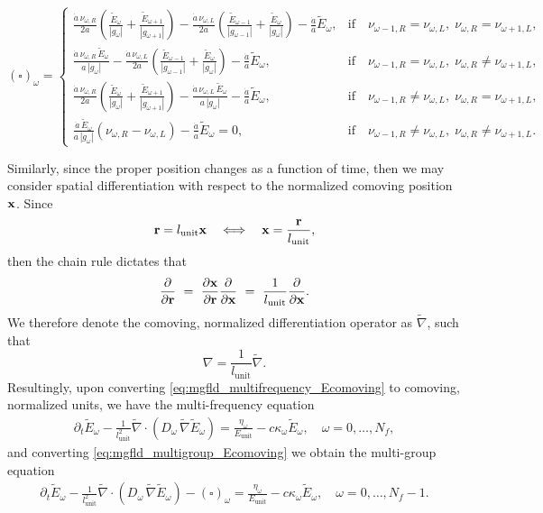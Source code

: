\documentclass[10pt]{article}
\renewcommand{\(}{\left(}
\renewcommand{\)}{\right)}
\newcommand{\xvec}{{\bf x}}
\newcommand{\rvec}{{\bf r}}
\newcommand{\adot}{\dot{a}}
\newcommand{\Lunit}{l_{\text{unit}}}
\newcommand{\Eunit}{E_{\text{unit}}}
\newcommand{\tE}{\tilde{E}}
\newcommand{\tnabla}{\tilde{\nabla}}
\begin{document}
\begin{equation}
\label{eq:square_omega}
  (\square)_{\omega} = \begin{cases}
     \frac{\adot\, \nu_{\omega,R}}{2a}\left(\frac{\tE_{\omega}}{|g_{\omega}|} + \frac{\tE_{\omega+1}}{|g_{\omega+1}|}\right) -
      \frac{\adot\, \nu_{\omega,L}}{2a}\left(\frac{\tE_{\omega-1}}{|g_{\omega-1}|}+\frac{\tE_{\omega}}{|g_{\omega}|}\right) -
      \frac{\adot}{a}\tE_{\omega},&
      \text{if}\quad \nu_{\omega-1,R}=\nu_{\omega,L},\; \nu_{\omega,R}=\nu_{\omega+1,L},\\
     \frac{\adot\, \nu_{\omega,R}\, \tE_{\omega}}{a\, |g_{\omega}|} -
      \frac{\adot\, \nu_{\omega,L}}{2a}\left(\frac{\tE_{\omega-1}}{|g_{\omega-1}|}+\frac{\tE_{\omega}}{|g_{\omega}|}\right) -
      \frac{\adot}{a}\tE_{\omega},&
      \text{if}\quad \nu_{\omega-1,R}=\nu_{\omega,L},\; \nu_{\omega,R}\ne\nu_{\omega+1,L},\\
     \frac{\adot\, \nu_{\omega,R}}{2a}\left(\frac{\tE_{\omega}}{|g_{\omega}|} + \frac{\tE_{\omega+1}}{|g_{\omega+1}|}\right) -
      \frac{\adot\, \nu_{\omega,L}\, \tE_{\omega}}{a\, |g_{\omega}|} -
      \frac{\adot}{a}\tE_{\omega},&
      \text{if}\quad \nu_{\omega-1,R}\ne\nu_{\omega,L},\; \nu_{\omega,R}=\nu_{\omega+1,L},\\
     \frac{\adot\, \tE_{\omega}}{a\, |g_{\omega}|}\left(\nu_{\omega,R} - \nu_{\omega,L}\right) -
      \frac{\adot}{a}\tE_{\omega} = 0,&
      \text{if}\quad \nu_{\omega-1,R}\ne\nu_{\omega,L},\; \nu_{\omega,R}\ne\nu_{\omega+1,L}.
  \end{cases}
\end{equation}


Similarly, since the proper position changes as a function of time,
then we may consider spatial differentiation with respect to the
normalized comoving position $\xvec$.  Since 
\[
   \rvec = \Lunit \xvec \quad\Longleftrightarrow\quad
   \xvec = \frac{\rvec}{\Lunit},
\]
then the chain rule dictates that
\[
   \frac{\partial}{\partial \rvec} \ = \
   \frac{\partial \xvec}{\partial \rvec}
   \frac{\partial}{\partial \xvec} \ = \
   \frac{1}{\Lunit}\frac{\partial}{\partial \xvec}.
\]
We therefore denote the comoving, normalized differentiation operator
as $\tnabla$, such that 
\[
   \nabla = \frac{1}{\Lunit}\tnabla.
\]
Resultingly, upon converting \eqref{eq:mgfld_multifrequency_Ecomoving}
to comoving, normalized units, we have the multi-frequency equation
\begin{align}
  \label{eq:mgfld_multifrequency_comoving}
  \partial_{t} \tE_{\omega} - \frac{1}{\Lunit^2}\tnabla\cdot\(D_{\omega}\,\tnabla \tE_{\omega}\)
    = \frac{\eta_{\omega}}{\Eunit} - c\kappa_{\omega} \tE_{\omega}, \quad \omega=0,\ldots,N_f,
\end{align}
and converting \eqref{eq:mgfld_multigroup_Ecomoving} we obtain the
multi-group equation 
\begin{align}
  \label{eq:mgfld_multigroup_comoving}
  \partial_{t} \tE_{\omega} - \frac{1}{\Lunit^2}\tnabla\cdot(D_{\omega}\,\tnabla \tE_{\omega}) -
    (\square)_{\omega} = \frac{\eta_{\omega}}{\Eunit} - c\kappa_{\omega} \tE_{\omega},
    \quad \omega=0,\ldots,N_f-1.
\end{align}
\end{document}
